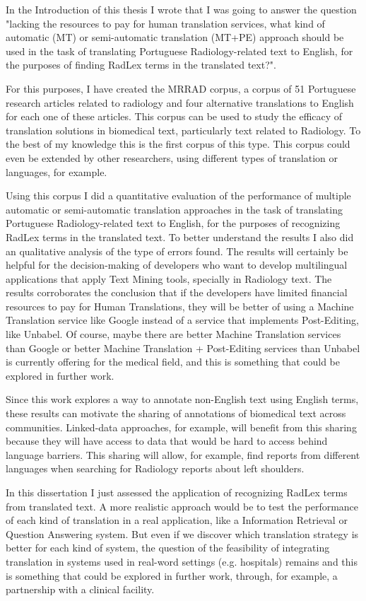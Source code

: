\label{chap5}

In the Introduction of this thesis I wrote that I was going to answer the question "lacking the resources to pay for human translation services, what kind of automatic (MT) or semi-automatic translation (MT+PE) approach should be used in the task of translating Portuguese Radiology-related text to English, for the purposes of finding RadLex terms in the translated text?". 

For this purposes, I have created the MRRAD corpus, a corpus of 51 Portuguese research articles related to radiology and four alternative translations to English for each one of these articles. This corpus can be used to study the efficacy of translation solutions in biomedical text, particularly text related to Radiology. To the best of my knowledge this is the first corpus of this type. This corpus could even be extended by other researchers, using different types of translation or languages, for example. 

Using this corpus I did a quantitative evaluation of the performance of multiple automatic or semi-automatic translation approaches in the task of translating Portuguese Radiology-related text to English, for the purposes of recognizing RadLex terms in the translated text. To better understand the results I also did an qualitative analysis of the type of errors found. The results will certainly be helpful for the decision-making of developers who want to develop multilingual applications that apply Text Mining tools, specially in Radiology text. The results corroborates the conclusion that if the developers have limited financial resources to pay for Human Translations, they will be better of using a Machine Translation service like Google instead of a service that implements Post-Editing, like Unbabel. Of course, maybe there are better Machine Translation services than Google or better Machine Translation + Post-Editing services than Unbabel is currently offering for the medical field, and this is something that could be explored in further work. 

Since this work explores a way to annotate non-English text using English terms, these results can motivate the sharing of annotations of biomedical text across communities. Linked-data \citep{Barros2016} approaches, for example, will benefit from this sharing because they will have access to data that would be hard to access behind language barriers. This sharing will allow, for example, find reports from different languages when searching for Radiology reports about left shoulders.

In this dissertation I just assessed the application of recognizing RadLex terms from translated text. A more realistic approach would be to test the performance of each kind of translation in a real application, like a Information Retrieval \citep{Manning} or Question Answering system. But even if we discover which translation strategy is better for each kind of system, the question of the feasibility of integrating translation in systems used in real-word settings (e.g. hospitals) remains and this is something that could be explored in further work, through, for example, a partnership with a clinical facility. 